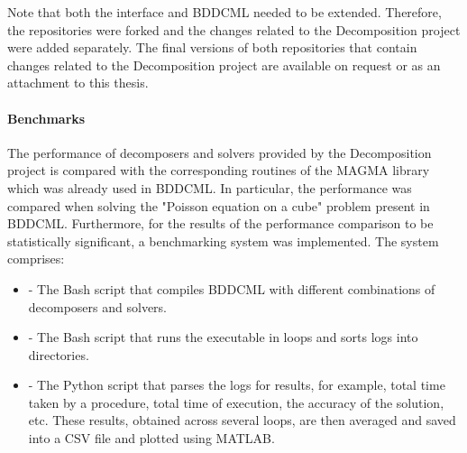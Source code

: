 Note that both the interface and BDDCML needed to be extended. Therefore, the repositories were forked and the changes related to the Decomposition project were added separately. The final versions of both repositories that contain changes related to the Decomposition project are available on request or as an attachment to this thesis.

\paragraph{Benchmarks} The performance of decomposers and solvers provided by the Decomposition project is compared with the corresponding routines of the MAGMA library \cite{Tomov2010} which was already used in BDDCML. In particular, the performance was compared when solving the "Poisson equation on a cube" problem present in BDDCML. Furthermore, for the results of the performance comparison to be statistically significant, a benchmarking system was implemented. The system comprises:

\begin{itemize}
	\item {} - The Bash script that compiles BDDCML with different combinations of decomposers and solvers.
	\item {} - The Bash script that runs the  executable in loops and sorts logs into directories.
	\item {} - The Python script that parses the logs for results, for example, total time taken by a procedure, total time of execution, the accuracy of the solution, etc. These results, obtained across several loops, are then averaged and saved into a CSV file and plotted using MATLAB.
\end{itemize}